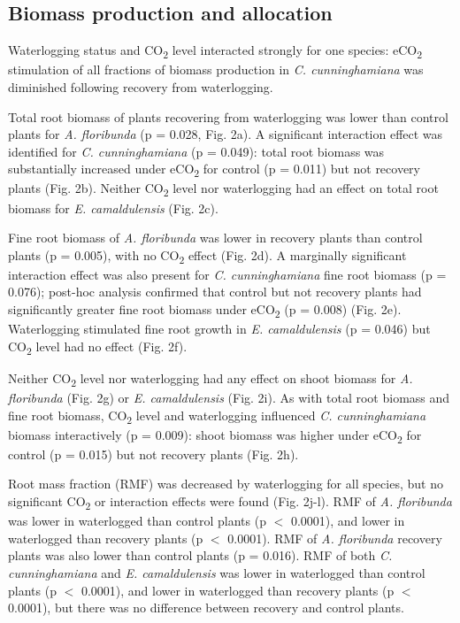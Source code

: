 \documentclass[openright,12pt,a4paper]{memoir}
\begin{document}
\subsection*{Biomass production and allocation}
Waterlogging status and CO\textsubscript{2} level interacted strongly for one species: eCO\textsubscript{2} stimulation of all fractions of biomass production in \textit{C. cunninghamiana} was diminished following recovery from waterlogging. 

Total root biomass of plants recovering from waterlogging was lower than control plants for \textit{A. floribunda} (p = 0.028, Fig. 2a). A significant interaction effect was identified for \textit{C. cunninghamiana} (p = 0.049): total root biomass was substantially increased under eCO\textsubscript{2} for control (p = 0.011) but not recovery plants (Fig. 2b). Neither CO\textsubscript{2} level nor waterlogging had an effect on total root biomass for \textit{E. camaldulensis} (Fig. 2c). 

Fine root biomass of \textit{A. floribunda} was lower in recovery plants than control plants (p = 0.005), with no CO\textsubscript{2} effect (Fig. 2d). A marginally significant interaction effect was also present for \textit{C. cunninghamiana} fine root biomass (p = 0.076); post-hoc analysis confirmed that control but not recovery plants had significantly greater fine root biomass under eCO\textsubscript{2} (p = 0.008) (Fig. 2e). Waterlogging stimulated fine root growth in \textit{E. camaldulensis} (p = 0.046) but CO\textsubscript{2} level had no effect (Fig. 2f).

Neither CO\textsubscript{2} level nor waterlogging had any effect on shoot biomass for \textit{A. floribunda} (Fig. 2g) or \textit{E. camaldulensis} (Fig. 2i). As with total root biomass and fine root biomass, CO\textsubscript{2} level and waterlogging influenced \textit{C. cunninghamiana} biomass interactively (p = 0.009): shoot biomass was higher under eCO\textsubscript{2} for control (p = 0.015) but not recovery plants (Fig. 2h).

Root mass fraction (RMF) was decreased by waterlogging for all species, but no significant CO\textsubscript{2} or interaction effects were found (Fig. 2j-l). RMF of \textit{A. floribunda} was lower in waterlogged than control plants (p $<$ 0.0001), and lower in waterlogged than recovery plants (p $<$ 0.0001). RMF of \textit{A. floribunda} recovery plants was also lower than control plants (p = 0.016). RMF of both \textit{C. cunninghamiana} and \textit{E. camaldulensis} was lower in waterlogged than control plants (p $<$ 0.0001), and lower in waterlogged than recovery plants (p $<$ 0.0001), but there was no difference between recovery and control plants.
\end{document}
